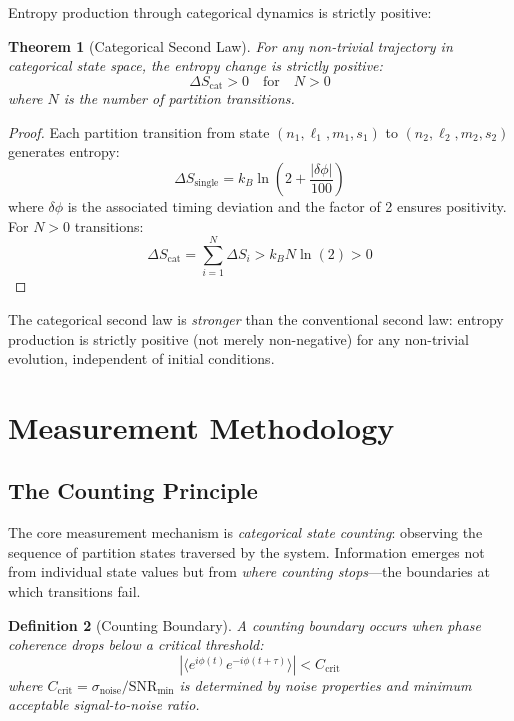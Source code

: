 \documentclass[twocolumn,10pt]{article}
\newtheorem{theorem}{Theorem}[section]
\newtheorem{definition}[theorem]{Definition}
\begin{document}
Entropy production through categorical dynamics is strictly positive:

\begin{theorem}[Categorical Second Law]
\label{thm:second_law}
For any non-trivial trajectory in categorical state space, the entropy change is strictly positive:
\begin{equation}
    \Delta S_{\text{cat}} > 0 \quad \text{for} \quad N > 0
\end{equation}
where $N$ is the number of partition transitions.
\end{theorem}

\begin{proof}
Each partition transition from state $(n_1, \ell_1, m_1, s_1)$ to $(n_2, \ell_2, m_2, s_2)$ generates entropy:
\begin{equation}
    \Delta S_{\text{single}} = k_B \ln\left(2 + \frac{|\delta\phi|}{100}\right)
\end{equation}
where $\delta\phi$ is the associated timing deviation and the factor of 2 ensures positivity. For $N > 0$ transitions:
\begin{equation}
    \Delta S_{\text{cat}} = \sum_{i=1}^{N} \Delta S_i > k_B N \ln(2) > 0
\end{equation}
\end{proof}

The categorical second law is \textit{stronger} than the conventional second law: entropy production is strictly positive (not merely non-negative) for any non-trivial evolution, independent of initial conditions.

\section{Measurement Methodology}

\subsection{The Counting Principle}

The core measurement mechanism is \textit{categorical state counting}: observing the sequence of partition states traversed by the system. Information emerges not from individual state values but from \textit{where counting stops}---the boundaries at which transitions fail.

\begin{definition}[Counting Boundary]
A counting boundary occurs when phase coherence drops below a critical threshold:
\begin{equation}
    |\langle e^{i\phi(t)} e^{-i\phi(t+\tau)} \rangle| < C_{\text{crit}}
    \label{eq:counting_boundary}
\end{equation}
where $C_{\text{crit}} = \sigma_{\text{noise}}/\text{SNR}_{\text{min}}$ is determined by noise properties and minimum acceptable signal-to-noise ratio.
\end{definition}
\end{document}
